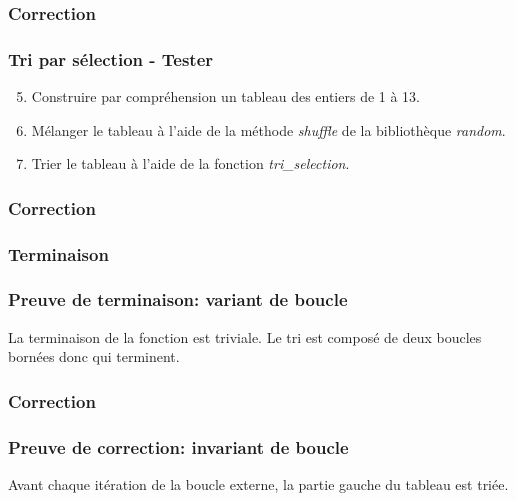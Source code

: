 \documentclass[svgnames,11pt]{beamer}
\begin{document}
\begin{frame}
    \frametitle{Correction}

    

\end{frame}

\begin{frame}
    \frametitle{Tri par sélection - Tester}
    \setcounter{compteuractivite}{1}
    \begin{activite}
        \begin{enumerate}
            \setcounter{enumi}{4}
            \item Construire par compréhension un tableau des entiers de 1 à 13.
            \item Mélanger le tableau à l'aide de la méthode \emph{shuffle} de la bibliothèque \emph{random}.
            \item Trier le tableau à l'aide de la fonction \emph{tri\_selection}.
        \end{enumerate}
    \end{activite}

\end{frame}

\begin{frame}
    \frametitle{Correction}

    

\end{frame}
\subsubsection{Terminaison}
\begin{frame}
    \frametitle{Preuve de terminaison: variant de boucle}

    La terminaison de la fonction est triviale. Le tri est composé de deux boucles bornées donc qui terminent.

\end{frame}

\subsubsection{Correction}
\begin{frame}
    \frametitle{Preuve de correction: invariant de boucle}

    Avant chaque itération de la boucle externe, la partie gauche du tableau est triée.

    \begin{center}
    \label{CODE}
    \end{center}
\end{frame}
\end{document}
